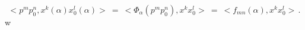 \begin{equation}< p^m p_0^n ,
x^k(\alpha) x_0^l(\alpha)> \ = \ < \Phi_\alpha(p^m p_0^n) , x^k
x_0^l > \ = \ < f_{m n}(\alpha) , x^k x_0^l >\,
.\label{51}\end{equation}w
